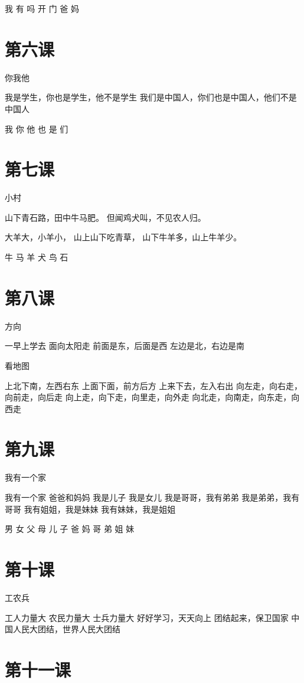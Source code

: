 \documentclass[12pt,UTF8]{ctexbook}
\begin{document}
我 有 吗 开 门 爸 妈

\section{第六课}

你我他

我是学生，你也是学生，他不是学生
我们是中国人，你们也是中国人，他们不是中国人

我 你 他 也 是 们

\section{第七课}

小村

山下青石路，田中牛马肥。
但闻鸡犬叫，不见农人归。

大羊大，小羊小，
山上山下吃青草，
山下牛羊多，山上牛羊少。

牛 马 羊 犬 鸟 石

\section{第八课}

方向

一早上学去
面向太阳走
前面是东，后面是西
左边是北，右边是南

看地图

上北下南，左西右东
上面下面，前方后方
上来下去，左入右出
向左走，向右走，向前走，向后走
向上走，向下走，向里走，向外走
向北走，向南走，向东走，向西走

\section{第九课}

我有一个家

我有一个家
爸爸和妈妈
我是儿子
我是女儿
我是哥哥，我有弟弟
我是弟弟，我有哥哥
我有姐姐，我是妹妹
我有妹妹，我是姐姐

男 女 父 母 儿 子
爸 妈 哥 弟 姐 妹

\section{第十课}

工农兵

工人力量大
农民力量大
士兵力量大
好好学习，天天向上
团结起来，保卫国家
中国人民大团结，世界人民大团结

\section{第十一课}
\end{document}
